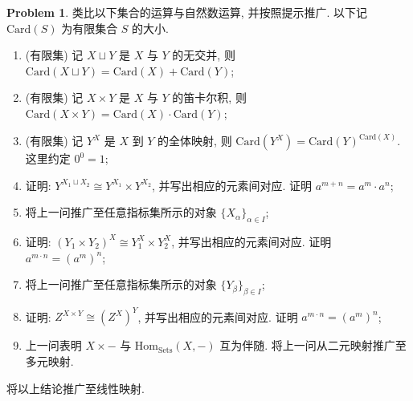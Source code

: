 \documentclass{MainStyle}
\theoremstyle{definition}
\newtheorem{problem}{Problem}
\begin{document}
\begin{problem}
类比以下集合的运算与自然数运算, 并按照提示推广. 以下记 $\mathrm{Card}(S)$ 为有限集合 $S$ 的大小.
\begin{enumerate}
    \item (有限集) 记 $X\sqcup Y$ 是 $X$ 与 $Y$ 的无交并, 则 $\mathrm{Card}(X\sqcup Y)=\mathrm{Card}(X)+\mathrm{Card}(Y)$;
    \item (有限集) 记 $X\times Y$ 是 $X$ 与 $Y$ 的笛卡尔积, 则 $\mathrm{Card}(X\times Y)=\mathrm{Card}(X)\cdot \mathrm{Card}(Y)$;
    \item (有限集) 记 $Y^X$ 是 $X$ 到 $Y$ 的全体映射, 则 $\mathrm{Card}(Y^X)=\mathrm{Card}(Y)^{\mathrm{Card}(X)}$. 这里约定 $0^0=1$;
    \item 证明: $Y^{X_1\sqcup X_2}\cong Y^{X_1}\times Y^{X_2}$, 并写出相应的元素间对应. 证明 $a^{m+n}=a^m\cdot a^n$;
    \item 将上一问推广至任意指标集所示的对象 $\{X_\alpha\}_{\alpha\in I}$;
    \item 证明: $(Y_1\times Y_2)^{X}\cong Y_1^X\times Y_2^X$, 并写出相应的元素间对应. 证明 $a^{m\cdot n}=(a^m)^n$;
    \item 将上一问推广至任意指标集所示的对象 $\{Y_\beta\}_{\beta\in I}$;
    \item 证明: $Z^{X\times Y}\cong (Z^X)^Y$, 并写出相应的元素间对应. 证明 $a^{m\cdot n}=(a^m)^n$;
    \item 上一问表明 $X\times -$ 与 $\mathrm{Hom}_{\mathrm{Sets}}(X,-)$ 互为伴随. 将上一问从二元映射推广至多元映射.
\end{enumerate}
将以上结论推广至线性映射.
\end{problem}
\end{document}
